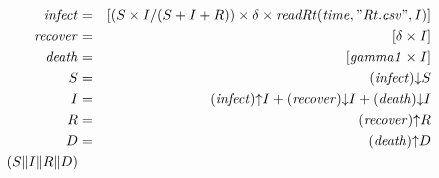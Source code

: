 \begin{eqnarray*}
\mathit{infect} & = & [(S\times I/(S+I+R))\times \delta\times \mathit{readRt}(\mathit{time},"\mathit{Rt}.\mathit{csv}", I)]\\%
\mathit{recover} & = & [\delta\times I]\\%
\mathit{death} & = & [\mathit{gamma1}\times I]\\%
%
S & = & (\mathit{infect}){\downarrow}S\\%
I & = & (\mathit{infect}){\uparrow}I + (\mathit{recover}){\downarrow}I + (\mathit{death}){\downarrow}I\\%
R & = & (\mathit{recover}){\uparrow}R\\%
D & = & (\mathit{death}){\uparrow}D\\%
%
(S {\parallel} I {\parallel} R {\parallel} D)\end{eqnarray*}

